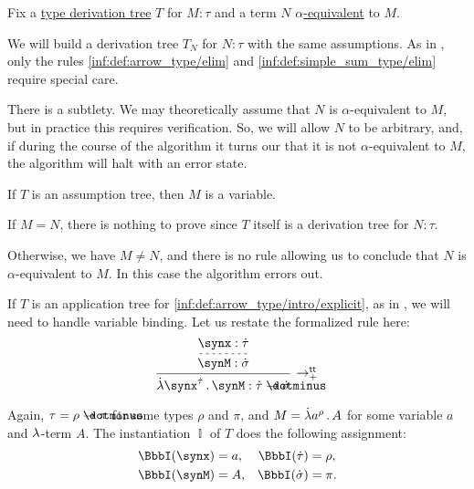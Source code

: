 \begin{algorithm}\label{alg:simply_typed_alpha_conversion}
  Fix a \hyperref[def:type_derivation_tree]{type derivation tree} \( T \) for \( M: \tau \) and a term \( N \) \hyperref[def:typed_term_alpha_equivalence]{\( \alpha \)-equivalent} to \( M \).

  We will build a derivation tree \( T_N \) for \( N: \tau \) with the same assumptions. As in , only the rules \ref{inf:def:arrow_type/elim} and \ref{inf:def:simple_sum_type/elim} require special care.

  There is a subtlety. We may theoretically assume that \( N \) is \( \alpha \)-equivalent to \( M \), but in practice this requires verification. So, we will allow \( N \) to be arbitrary, and, if during the course of the algorithm it turns our that it is not \( \alpha \)-equivalent to \( M \), the algorithm will halt with an error state.

  \begin{thmenum}
     If \( T \) is an assumption tree, then \( M \) is a variable.
    \begin{thmenum}
       If \( M = N \), there is nothing to prove since \( T \) itself is a derivation tree for \( N: \tau \).

       Otherwise, we have \( M \neq N \), and there is no rule allowing us to conclude that \( N \) is \( \alpha \)-equivalent to \( M \). In this case the algorithm errors out.
    \end{thmenum}

     If \( T \) is an application tree for \ref{inf:def:arrow_type/intro/explicit}, as in , we will need to handle variable binding. Let us restate the formalized rule here:
    \begin{equation*}
      \begin{prooftree}
        \hypo{ \synx: \syn\tau }
        \infer[dashed]1{ \synM: \syn\sigma }
        \infer1[\ensuremath{ \rightarrow_+^{\logic{tt}} }]{ \qabs {\synx^{\syn\tau}} \synM: \syn\tau \synimplies \syn\sigma }
      \end{prooftree}
    \end{equation*}

    Again, \( \tau = \rho \synimplies \pi \) for some types \( \rho \) and \( \pi \), and \( M = \qabs {a^\rho} A \) for some variable \( a \) and \( {\mathrm \lambda} \)-term \( A \). The instantiation \( \BbbI \) of \( T \) does the following assignment:
    \begin{align*}
      \BbbI(\synx) &= a, &\BbbI(\syn\tau) &= \rho, \\
      \BbbI(\synM) &= A, &\BbbI(\syn\sigma) &= \pi.
    \end{align*}


\end{thmenum}
\end{algorithm}
